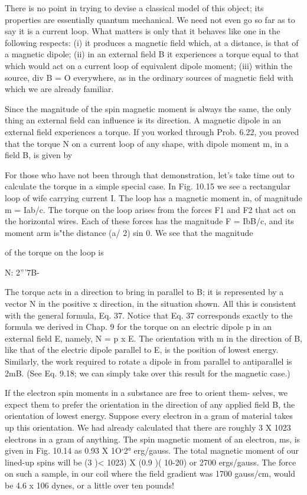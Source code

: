 There is no point in trying to devise a classical model of this object;
its properties are essentially quantum mechanical. We need not
even go so far as to say it is a current loop. What matters is only that
it behaves like one in the following respects: (i) it produces a magnetic
field which, at a distance, is that of a magnetic dipole; (ii) in an
external field B it experiences a torque equal to that which would
act on a current loop of equivalent dipole moment; (iii) within the
source, div B = O everywhere, as in the ordinary sources of magnetic
field with which we are already familiar.

Since the magnitude of the spin magnetic moment is always the
same, the only thing an external field can influence is its direction.
A magnetic dipole in an external field experiences a torque. If you
worked through Prob. 6.22, you proved that the torque N on a current
loop of any shape, with dipole moment m, in a field B, is given by

For those who have not been through that demonstration, let's take
time out to calculate the torque in a simple special case. In Fig. 10.15
we see a rectangular loop of wife carrying current I. The loop has
a magnetic moment in, of magnitude m = Iab/c. The torque on
the loop arises from the forces F1 and F2 that act on the horizontal
wires. Each of these forces has the magnitude F = IbB/c, and its
moment arm is"the distance (a/ 2) sin 0. We see that the magnitude

of the torque on the loop is
\begin{equation}
\end{equation}

N: 2'''7B-%

The torque acts in a direction to bring in parallel to B; it is represented
by a vector N in the positive x direction, in the situation
shown. All this is consistent with the general formula, Eq. 37.
Notice that Eq. 37 corresponds exactly to the formula we derived
in Chap. 9 for the torque on an electric dipole p in an external field E,
namely, N = p x E. The orientation with m in the direction of B,
like that of the electric dipole parallel to E, is the position of lowest
energy. Similarly, the work required to rotate a dipole in from parallel
to antiparallel is 2mB. (See Eq. 9.18; we can simply take over
this result for the magnetic case.)

If the electron spin moments in a substance are free to orient them-
selves, we expect them to prefer the orientation in the direction of
any applied field B, the orientation of lowest energy. Suppose every
electron in a gram of material takes up this orientation. We had
already calculated that there are roughly 3 X 1023 electrons in a gram
of anything. The spin magnetic moment of an electron, ms, is given
in Fig. 10.14 as 0.93 X 1O‘2° erg/gauss. The total magnetic moment
of our lined-up spins will be (3 )< 1023) X (0.9 )( 10-20) or 2700
ergs/gauss. The force on such a sample, in our coil where the field
gradient was 1700 gauss/cm, would be 4.6 x 106 dynes, or a little
over ten pounds!

